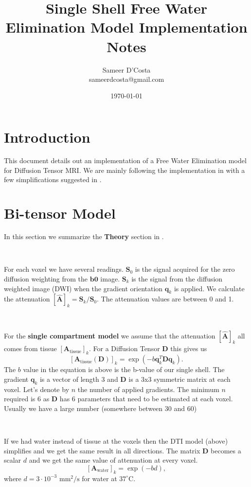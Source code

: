 \documentclass[12pt]{article}
\title{Single Shell Free Water Elimination Model Implementation Notes
}
\author{
  Sameer D'Costa \\
    sameerdcosta@gmail.com
}
\date{\today}
\newcommand{\vect}[1]{\mathbf{#1}}
\newcommand{\Ahat}{\hat{\vect{A}}}
\newcommand{\Atissue}{\vect{A}_{\text{tissue}}}
\newcommand{\Awater}{\vect{A}_{\text{water}}}
\begin{document}
\maketitle

\section{Introduction}
This document details out an implementation of a Free Water Elimination model
for Diffusion Tensor MRI. We are mainly following the implementation in
\cite{Pasternak2009} with a few simplifications suggested in \cite{Pasternak2014}.

\section{Bi-tensor Model}
In this section we summarize the \textbf{Theory} section in
\cite{Pasternak2009}. 

\ 

\noindent
For each voxel we have several readings. $\vect{S}_0$ is the signal acquired
for the zero diffusion weighting from the $\vect{b0}$ image. $\vect{S}_k$ is
the signal from the diffusion weighted image (DWI) when the gradient
orientation $\vect{q}_k$ is applied. We calculate the attenuation
$[\hat{\vect{A}}]_k = \vect{S}_k / \vect{S}_0$. The attenuation values are
between 0 and 1. 

\ 

\noindent
For the \textbf{single compartment model} we assume that the attenuation
$[\Ahat]_k$ all comes from tissue $[\Atissue]_k$. For a Diffusion Tensor
$\vect{D}$ this gives us 
$$[\Atissue(\vect{D})]_k = \exp(-b \vect{q}_k^T\vect{D}\vect{q}_k).$$
The $b$ value in the equation is above is the b-value of our single shell. The
gradient $\vect{q}_k$ is a vector of length 3 and $\vect{D}$ is a 3x3 symmetric
matrix at each voxel. Let's denote by $n$ the number of applied gradients.  The
minimum $n$ required is 6 as $\vect{D}$ has 6 parameters that need to be
estimated at each voxel. Usually we have a large number (somewhere between 30
and 60) 


\ 

\noindent
If we had water instead of tissue at the voxels then the DTI model (above)
simplifies and we get the same result in all directions. The matrix $\vect{D}$
becomes a scalar $d$ and we get the same value of attenuation at every voxel.
$$[\Awater]_k = \exp(-bd),$$
where $d = 3 \cdot 10^{-3}$ $\text{mm}^2/\text{s}$ for water at $37^\circ$C. 
\end{document}
